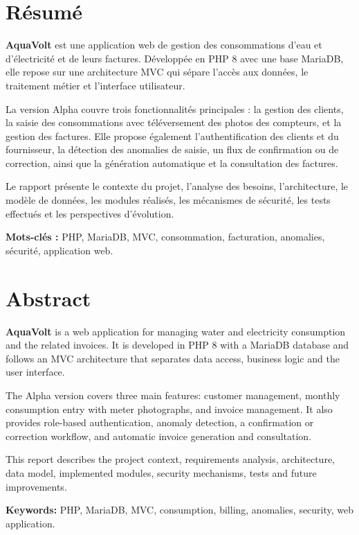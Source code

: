 \section*{Résumé}

\textbf{AquaVolt} est une application web de gestion des consommations d'eau et d'électricité et de leurs factures. Développée en PHP 8 avec une base MariaDB, elle repose sur une architecture MVC qui sépare l'accès aux données, le traitement métier et l'interface utilisateur.

La version Alpha couvre trois fonctionnalités principales : la gestion des clients, la saisie des consommations avec téléversement des photos des compteurs, et la gestion des factures. Elle propose également l'authentification des clients et du fournisseur, la détection des anomalies de saisie, un flux de confirmation ou de correction, ainsi que la génération automatique et la consultation des factures.

Le rapport présente le contexte du projet, l'analyse des besoins, l'architecture, le modèle de données, les modules réalisés, les mécanismes de sécurité, les tests effectués et les perspectives d'évolution.

\vspace{0.5cm}
\noindent\textbf{Mots-clés :} PHP, MariaDB, MVC, consommation, facturation, anomalies, sécurité, application web.

\section*{Abstract}

\textbf{AquaVolt} is a web application for managing water and electricity consumption and the related invoices. It is developed in PHP 8 with a MariaDB database and follows an MVC architecture that separates data access, business logic and the user interface.

The Alpha version covers three main features: customer management, monthly consumption entry with meter photographs, and invoice management. It also provides role-based authentication, anomaly detection, a confirmation or correction workflow, and automatic invoice generation and consultation.

This report describes the project context, requirements analysis, architecture, data model, implemented modules, security mechanisms, tests and future improvements.

\vspace{0.5cm}
\noindent\textbf{Keywords:} PHP, MariaDB, MVC, consumption, billing, anomalies, security, web application.

\clearpage
